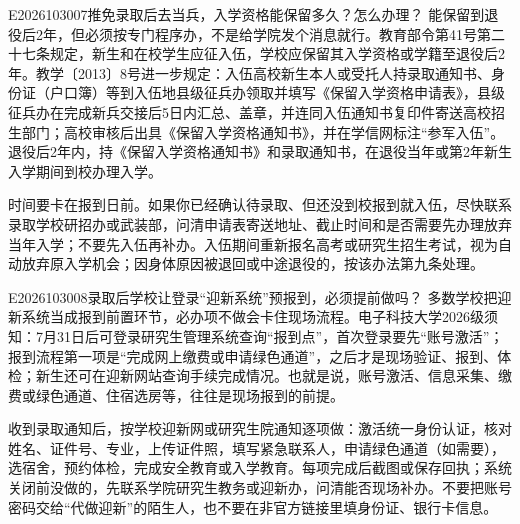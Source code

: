 \begin{qa}{E2026103007}{推免录取后去当兵，入学资格能保留多久？怎么办理？}
能保留到退役后2年，但必须按专门程序办，不是给学院发个消息就行。教育部令第41号第二十七条规定，新生和在校学生应征入伍，学校应保留其入学资格或学籍至退役后2年。教学〔2013〕8号进一步规定：入伍高校新生本人或受托人持录取通知书、身份证（户口簿）等到入伍地县级征兵办领取并填写《保留入学资格申请表》，县级征兵办在完成新兵交接后5日内汇总、盖章，并连同入伍通知书复印件寄送高校招生部门；高校审核后出具《保留入学资格通知书》，并在学信网标注“参军入伍”。退役后2年内，持《保留入学资格通知书》和录取通知书，在退役当年或第2年新生入学期间到校办理入学。

时间要卡在报到日前。如果你已经确认待录取、但还没到校报到就入伍，尽快联系录取学校研招办或武装部，问清申请表寄送地址、截止时间和是否需要先办理放弃当年入学；不要先入伍再补办。入伍期间重新报名高考或研究生招生考试，视为自动放弃原入学机会；因身体原因被退回或中途退役的，按该办法第九条处理。
\end{qa}

\begin{qa}{E2026103008}{录取后学校让登录“迎新系统”预报到，必须提前做吗？}
多数学校把迎新系统当成报到前置环节，必办项不做会卡住现场流程。电子科技大学2026级须知：7月31日后可登录研究生管理系统查询“报到点”，首次登录要先“账号激活”；报到流程第一项是“完成网上缴费或申请绿色通道”，之后才是现场验证、报到、体检；新生还可在迎新网站查询手续完成情况。也就是说，账号激活、信息采集、缴费或绿色通道、住宿选房等，往往是现场报到的前提。

收到录取通知后，按学校迎新网或研究生院通知逐项做：激活统一身份认证，核对姓名、证件号、专业，上传证件照，填写紧急联系人，申请绿色通道（如需要），选宿舍，预约体检，完成安全教育或入学教育。每项完成后截图或保存回执；系统关闭前没做的，先联系学院研究生教务或迎新办，问清能否现场补办。不要把账号密码交给“代做迎新”的陌生人，也不要在非官方链接里填身份证、银行卡信息。
\end{qa}

